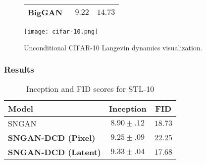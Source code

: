 \documentclass{article}
\begin{document}
\begin{figure*}[t]
\begin{minipage}{0.55\textwidth}
\begin{center}
\begin{adjustbox}{max width=.9\linewidth}
\begin{tabular}{lcc}
        BigGAN~\cite{brock2018large} & $\mathbf{9.22}$ & $\mathbf{14.73}$\\
        \bottomrule
    \end{tabular}
\end{adjustbox}
\end{center}
 \label{tab:score-cifar}
\end{minipage}
\hspace{+5pt}
\begin{minipage}{0.4\textwidth}
    \centering
    \texttt{[image: cifar-10.png]}
\caption{Unconditional CIFAR-10 Langevin dynamics visualization.}
    \label{fig:mcmc-cifar}
\end{minipage}
\end{figure*}

\subsubsection{Results}

\begin{wraptable}{r}{0.5\textwidth}
\vspace{-10pt}
\begin{center}
\begin{adjustbox}{max width=1.2\linewidth}
\begin{tabular}{lcc}
        \toprule
        Model & Inception & FID\\
        \midrule
        SNGAN~\cite{miyato2018spectral} & $8.90\pm .12$ & $18.73$ \\
        \textbf{SNGAN-DCD (Pixel)} & {$9.25 \pm .09$} & $22.25$\\
        \textbf{SNGAN-DCD (Latent)} & {$\mathbf{9.33} \pm .04$} & $17.68$\\
        \bottomrule
    \end{tabular} 
\end{adjustbox}
\end{center}
\caption{Inception and FID scores for STL-10} \label{tab:score-stl}
\end{wraptable}
\end{document}
